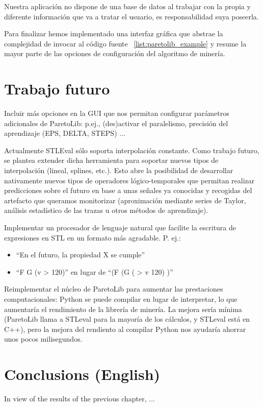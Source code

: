 Nuestra aplicación no dispone de una base de datos al trabajar con la propia y diferente información que va a tratar el usuario, es responsabilidad suya poseerla.

Para finalizar hemos implementado una interfaz gráfica que abstrae la complejidad de invocar al código fuente ~\ref{list:paretolib_example} y resume la mayor parte de las opciones de configuración del algoritmo de minería.


\section{Trabajo futuro}

Incluir más opciones en la GUI que nos permitan configurar parámetros adicionales de ParetoLib: p.ej., (des)activar el paralelismo, precisión del aprendizaje (EPS, DELTA, STEPS) ...

Actualmente STLEval sólo soporta interpolación constante. Como trabajo futuro, se plantea extender dicha herramienta para soportar nuevos tipos de interpolación (lineal, splines, etc.). Esto abre la posibilidad de desarrollar nativamente nuevos tipos de operadores lógico-temporales que permitan realizar predicciones sobre el futuro en base a unas señales ya conocidas y recogidas del artefacto que queramos monitorizar (aproximación mediante series de Taylor, análisis estadístico de las trazas u otros métodos de aprendizaje).

Implementar un procesador de lenguaje natural que facilite la escritura de expresiones en STL en un formato más agradable. P. ej.:
\begin{itemize}
 \item ``En el futuro, la propiedad X se cumple''
 \item ``F G (v > 120)'' en lugar de ``(F (G ( > v 120) )''
\end{itemize}

Reimplementar el núcleo de ParetoLib para aumentar las prestaciones computacionales: Python se puede compilar en lugar de interpretar, lo que aumentaría el rendimiento de la librería de minería. La mejora sería mínima (ParetoLib llama a STLeval para la mayoría de los cálculos, y STLeval está en C++), pero la mejora del rendiento al compilar Python nos ayudaría ahorrar unos pocos milisegundos.

\section{Conclusions (English)}
In view of the results of the previous chapter, $\ldots$


